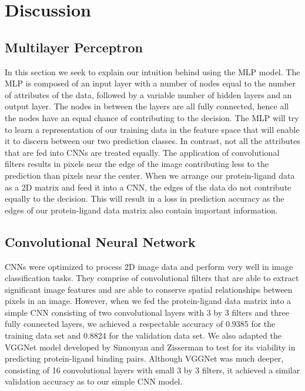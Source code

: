 \documentclass[11pt]{article}
\begin{document}
\section{Discussion}
\subsection{Multilayer Perceptron}
In this section we seek to explain our intuition behind using the MLP model. The MLP is composed of an input layer with a number of nodes equal to the number of attributes of the data, followed by a variable number of hidden layers and an output layer. The nodes in between the layers are all fully connected, hence all the nodes have an equal chance of contributing to the decision. The MLP will try to learn a representation of our training data in the feature space that will enable it to discern between our two prediction classes. In contrast, not all the attributes that are fed into CNNs are treated equally. The application of convolutional filters results in pixels near the edge of the image contributing less to the prediction than pixels near the center. When we arrange our protein-ligand data as a 2D matrix and feed it into a CNN, the edges of the data do not contribute equally to the decision. This will result in a loss in prediction accuracy as the edges of our protein-ligand data matrix also contain important information. 

\subsection{Convolutional Neural Network}
CNNs were optimized to process 2D image data and perform very well in image classification tasks. \cite{krizhevsky2012imagenet,simonyan2014very,szegedy2015going} They comprise of convolutional filters that are able to extract significant image features and are able to conserve spatial relationships between pixels in an image. However, when we fed the protein-ligand data matrix into a simple CNN consisting of two convolutional layers with 3 by 3 filters and three fully connected layers, we achieved a respectable accuracy of 0.9385 for the training data set and 0.8824 for the validation data set. We also adapted the VGGNet model developed by Simonyan and Zisserman \cite{simonyan2014very} to test for its viability in predicting protein-ligand binding pairs. Although VGGNet was much deeper, consisting of 16 convolutional layers with small 3 by 3 filters, it achieved a similar validation accuracy as to our simple CNN model.
\end{document}
